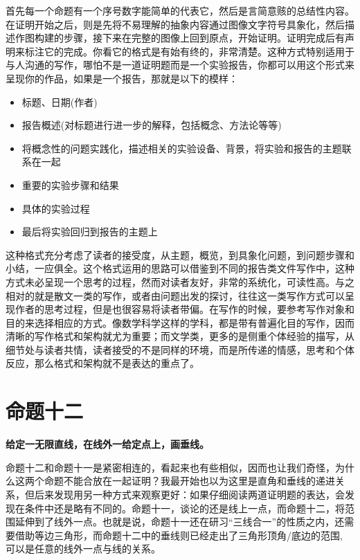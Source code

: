 \documentclass[
]{book}
\providecommand{\tightlist}{%
  \setlength{\itemsep}{0pt}\setlength{\parskip}{0pt}}
\begin{document}
首先每一个命题有一个序号数字能简单的代表它，然后是言简意赅的总结性内容。在证明开始之后，则是先将不易理解的抽象内容通过图像文字符号具象化，然后描述作图构建的步骤，接下来在完整的图像上回到原点，开始证明。证明完成后有声明来标注它的完成。你看它的格式是有始有终的，非常清楚。这种方式特别适用于与人沟通的写作，哪怕不是一道证明题而是一个实验报告，你都可以用这个形式来呈现你的作品，如果是一个报告，那就是以下的模样：

\begin{itemize}
\tightlist
\item
  标题、日期(作者)
\item
  报告概述(对标题进行进一步的解释，包括概念、方法论等等)
\item
  将概念性的问题实践化，描述相关的实验设备、背景，将实验和报告的主题联系在一起
\item
  重要的实验步骤和结果
\item
  具体的实验过程
\item
  最后将实验回归到报告的主题上
\end{itemize}

这种格式充分考虑了读者的接受度，从主题，概览，到具象化问题，到问题步骤和小结，一应俱全。这个格式运用的思路可以借鉴到不同的报告类文件写作中，这种方式未必呈现一个思考的过程，然而对读者友好，非常的系统化，可读性高。与之相对的就是散文一类的写作，或者由问题出发的探讨，往往这一类写作方式可以呈现作者的思考过程，但是也很容易将读者带偏。在写作的时候，要参考写作对象和目的来选择相应的方式。像数学科学这样的学科，都是带有普遍化目的写作，因而清晰的写作格式和架构就尤为重要；而文学类，更多的是侧重个体经验的描写，从细节处与读者共情，读者接受的不是同样的环境，而是所传递的情感，思考和个体反应，那么格式和架构就不是表达的重点了。

\hypertarget{ux547dux9898ux5341ux4e8c}{%
\section{命题十二}\label{ux547dux9898ux5341ux4e8c}}

\textbf{给定一无限直线，在线外一给定点上，画垂线。}

命题十二和命题十一是紧密相连的，看起来也有些相似，因而也让我们奇怪，为什么这两个命题不能合放在一起证明？我最开始也以为这里是直角和垂线的递进关系，但后来发现用另一种方式来观察更好：如果仔细阅读两道证明题的表达，会发现在条件中还是略有不同的。命题十一，谈论的还是线上一点，而命题十二，将范围延伸到了线外一点。也就是说，命题十一还在研习``三线合一''的性质之内，还需要借助等边三角形，而命题十二中的垂线则已经走出了三角形顶角/底边的范围, 可以是任意的线外一点与线的关系。
\end{document}
